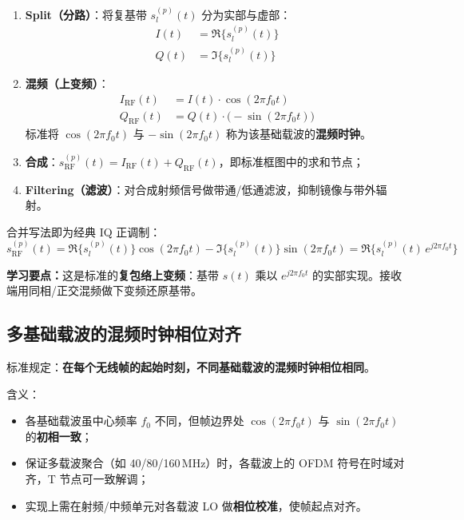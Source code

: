 \documentclass[11pt,a4paper]{ctexart}
\newcommand{\learn}[1]{\par\noindent\textcolor{blue!70!black}{\textbf{学习要点：}#1}\par}
\begin{document}
\begin{enumerate}
  \item \textbf{Split（分路）}：将复基带 $s_l^{(p)}(t)$ 分为实部与虚部：
        \begin{align}
        I(t)&=\Re\{s_l^{(p)}(t)\} \\
        Q(t)&=\Im\{s_l^{(p)}(t)\}
        \end{align}
  \item \textbf{混频（上变频）}：
        \begin{align}
        I_{\mathrm{RF}}(t)&=I(t)\cdot\cos(2\pi f_0 t) \\
        Q_{\mathrm{RF}}(t)&=Q(t)\cdot\bigl(-\sin(2\pi f_0 t)\bigr)
        \end{align}
        标准将 $\cos(2\pi f_0 t)$ 与 $-\sin(2\pi f_0 t)$ 称为该基础载波的\textbf{混频时钟}。
  \item \textbf{合成}：$s_{\mathrm{RF}}^{(p)}(t)=I_{\mathrm{RF}}(t)+Q_{\mathrm{RF}}(t)$，即标准框图中的求和节点；
  \item \textbf{Filtering（滤波）}：对合成射频信号做带通/低通滤波，抑制镜像与带外辐射。
\end{enumerate}

合并写法即为经典 IQ 正调制：
\begin{equation}
s_{\mathrm{RF}}^{(p)}(t)=\Re\{s_l^{(p)}(t)\}\cos(2\pi f_0 t)
-\Im\{s_l^{(p)}(t)\}\sin(2\pi f_0 t)
=\Re\{s_l^{(p)}(t)\,e^{j2\pi f_0 t}\}
\end{equation}

\learn{这是标准的\textbf{复包络上变频}：基带 $s(t)$ 乘以 $e^{j2\pi f_0 t}$ 的实部实现。接收端用同相/正交混频做下变频还原基带。}

\subsection{多基础载波的混频时钟相位对齐}

标准规定：\textbf{在每个无线帧的起始时刻，不同基础载波的混频时钟相位相同}。

含义：
\begin{itemize}
  \item 各基础载波虽中心频率 $f_0$ 不同，但帧边界处 $\cos(2\pi f_0 t)$ 与 $\sin(2\pi f_0 t)$ 的\textbf{初相一致}；
  \item 保证多载波聚合（如 40/80/160\,MHz）时，各载波上的 OFDM 符号在时域对齐，T 节点可一致解调；
  \item 实现上需在射频/中频单元对各载波 LO 做\textbf{相位校准}，使帧起点对齐。
\end{itemize}
\end{document}

